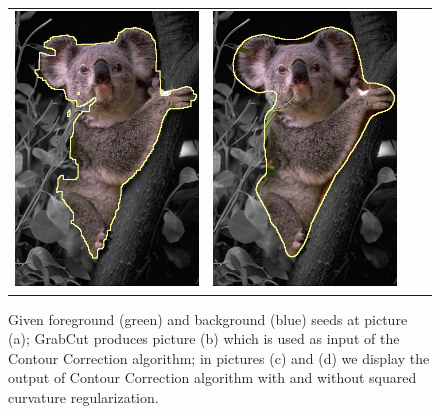 \begin{figure}
\begin{tabular}{cccc}
 	\includegraphics[scale=0.25]{figures/chapter6/segmentation/coala/mt_improve/radius_5/data_0.50/sq_0.00/length_0.50/it_50/corrected-seg.png} & 
 	\includegraphics[scale=0.25]{figures/chapter6/segmentation/coala/mt_improve/radius_5/data_0.50/sq_1.00/length_0.50/it_50/corrected-seg.png}
\end{tabular}	
\caption{Given foreground (green) and background (blue) seeds at picture (a); GrabCut produces picture (b) which is used as input of the Contour Correction algorithm; in pictures (c) and (d) we display the output of Contour Correction algorithm with and without squared curvature regularization. }
\label{ch6:fig:segmentation}
\end{figure}

